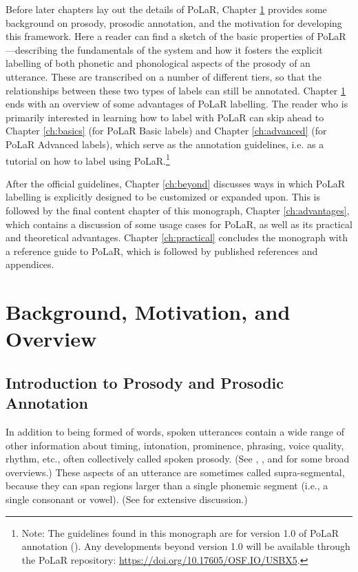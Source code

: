 \documentclass[11pt, twoside]{memoir}
\begin{document}
Before later chapters lay out the details of PoLaR, Chapter \ref{ch:background} provides some background on prosody, prosodic annotation, and the motivation for developing this framework. Here a reader can find a sketch of the basic properties of PoLaR —describing the fundamentals of the system and how it fosters the explicit labelling of both phonetic and phonological aspects of the prosody of an utterance. These are transcribed on a number of different tiers, so that the relationships between these two types of labels can still be annotated. 
Chapter \ref{ch:background} ends with an overview of some advantages of PoLaR labelling. The reader who is primarily interested in learning how to label with PoLaR can skip ahead to Chapter \ref{ch:basics} (for PoLaR Basic labels) and Chapter \ref{ch:advanced} (for PoLaR Advanced labels), which serve as the annotation guidelines, i.e. as a tutorial on how to label using PoLaR.\footnote{Note: The guidelines found in this monograph are for version 1.0 of PoLaR annotation (\citealt{ahn-21}). Any developments beyond version 1.0 will be available through the PoLaR repository: \href{https://doi.org/10.17605/OSF.IO/USBX5}{https://doi.org/10.17605/OSF.IO/USBX5}.}

After the official guidelines, Chapter \ref{ch:beyond} discusses ways in which PoLaR labelling is explicitly designed to be customized or expanded upon. This is followed by the final content chapter of this monograph, Chapter \ref{ch:advantages}, which contains a discussion of some usage cases for PoLaR, as well as its practical and theoretical advantages. Chapter \ref{ch:practical} concludes the monograph with a reference guide to PoLaR, which is followed by published references and appendices.

\renewcommand*{\thefootnote}{\arabic{footnote}}



\chapter{Background, Motivation, and Overview}\label{ch:background}

\section{Introduction to Prosody and Prosodic Annotation}\label{sec:introduction-to-prosody-and-prosodic-annotation}

In addition to being formed of words, spoken utterances contain a wide range of other information about timing, intonation, prominence, phrasing, voice quality, rhythm, etc., often collectively called spoken prosody. (See \citealt{ladd08}, \citealt{beckmanvenditti11}, and \citealt{barnesshattuckhufnagel20} for some broad overviews.) These aspects of an utterance are sometimes called supra-segmental, because they can span regions larger than a single phonemic segment (i.e., a single consonant or vowel). (See \citealt{lehiste70} for extensive discussion.)
\end{document}
